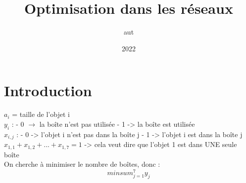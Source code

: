 \documentclass{article}
\title{Optimisation dans les réseaux}
\author{aut}
\date{2022}
\begin{document}
\maketitle

\section{Introduction}
$a_i$ = taille de l'objet i
\\%
$y_i$ :
- 0 $\rightarrow$ la boîte n'est pas utilisée
- 1 -> la boîte est utilisée
\\%
$x_{i, j}$ :
- 0 -> l'objet i n'est pas dans la boîte j
- 1 -> l'objet i est dans la boîte j
\\%
$x_{1, 1} + x_{1, 2} + ... + x_{1, 7} = 1$ -> cela veut dire que l'objet 1 est dans UNE seule boîte
\\%
On cherche à minimiser le nombre de boîtes, donc :
$$min sum_{j=1}^{7} y_j$$
\end{document}
